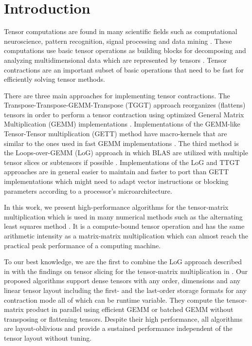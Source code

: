 \section{Introduction}
\label{sec:introduction}
Tensor computations are found in many scientific fields such as computational neuroscience, pattern recognition, signal processing and data mining \cite{karahan:2015:tensor, papalexakis:2017:tensors}.
These computations use basic tensor operations as building blocks for decomposing and analyzing multidimensional data which are represented by tensors \cite{lee:2018:fundamental, kolda:2009:decompositions}. 
Tensor contractions are an important subset of basic operations that need to be fast for efficiently solving tensor methods.

There are three main approaches for implementing tensor contractions.
The Transpose-Transpose-GEMM-Transpose (TGGT) approach reorganizes (flattens) tensors in order to perform a tensor contraction using optimized General Matrix Multiplication (GEMM) implementations \cite{bader:2006:algorithm862, solomonik:2013:cyclops}.
Implementations of the GEMM-like Tensor-Tensor multiplication (GETT) method have macro-kernels that are similar to the ones used in fast GEMM implementations \cite{springer:2018:design, matthews:2018:high}.
The third method is the Loops-over-GEMM (LoG) approach in which BLAS are utilized with multiple tensor slices or subtensors if possible \cite{dinapoli:2014:towards.efficient.use, li:2015:input, shi:2016:tensor.contraction, bassoy:2019:ttv}.
Implementations of the LoG and TTGT approaches are in general easier to maintain and faster to port than GETT implementations which might need to adapt vector instructions or blocking parameters according to a processor's microarchitecture.


In this work, we present high-performance algorithms for the tensor-matrix multiplication which is used in many numerical methods such as the alternating least squares method \cite{lee:2018:fundamental, kolda:2009:decompositions}.
It is a compute-bound tensor operation and has the same arithmetic intensity as a matrix-matrix multiplication which can almost reach the practical peak performance of a computing machine.

To our best knowledge, we are the first to combine the LoG approach described in \cite{bassoy:2019:ttv} with the findings on tensor slicing for the tensor-matrix multiplication in \cite{li:2015:input}.
Our proposed algorithms support dense tensors with any order, dimensions and any linear tensor layout including the first- and the last-order storage formats for any contraction mode all of which can be runtime variable.
They compute the tensor-matrix product in parallel using efficient GEMM or batched GEMM without transposing or flattening tensors.
Despite their high performance, all algorithms are layout-oblivious and provide a sustained performance independent of the tensor layout without tuning.

